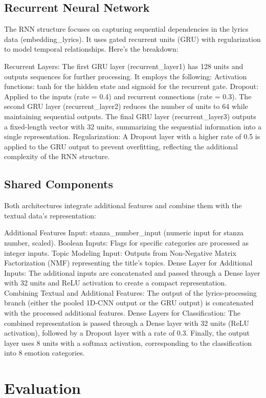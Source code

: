 \subsection*{Recurrent Neural Network}
The RNN structure focuses on capturing sequential dependencies in the lyrics
data (embedding\_lyrics). It uses gated recurrent units (GRU) with
regularization to model temporal relationships. Here's the breakdown:

Recurrent Layers:
The first GRU layer (recurrent\_layer1) has 128 units and outputs sequences
for further processing. It employs the following:
Activation functions: tanh for the hidden state and sigmoid for the recurrent
gate.
Dropout: Applied to the inputs (rate = 0.4) and recurrent connections
(rate = 0.3).
The second GRU layer (recurrent\_layer2) reduces the number of units to 64
while maintaining sequential outputs.
The final GRU layer (recurrent\_layer3) outputs a fixed-length vector with
32 units, summarizing the sequential information into a single representation.
Regularization:
A Dropout layer with a higher rate of 0.5 is applied to the GRU output to
prevent overfitting, reflecting the additional complexity of the RNN structure.


\subsection*{Shared Components}
Both architectures integrate additional features and combine them with the textual data's representation:

Additional Features Input:
stanza\_number\_input (numeric input for stanza number, scaled).
Boolean Inputs: Flags for specific categories are processed as integer inputs.
Topic Modeling Input: Outputs from Non-Negative Matrix Factorization (NMF)
representing the title's topics.
Dense Layer for Additional Inputs:
The additional inputs are concatenated and passed through a Dense layer with
32 units and ReLU activation to create a compact representation.
Combining Textual and Additional Features:
The output of the lyrics-processing branch (either the pooled 1D-CNN output
or the GRU output) is concatenated with the processed additional features.
Dense Layers for Classification:
The combined representation is passed through a Dense layer with 32 units
(ReLU activation), followed by a Dropout layer with a rate of 0.3.
Finally, the output layer uses 8 units with a softmax activation, corresponding
to the classification into 8 emotion categories.


\section*{Evaluation}
